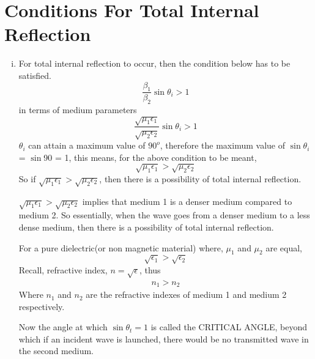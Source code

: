 \section{Conditions For Total Internal Reflection}
\begin{enumerate}[(i)]
\item For total internal reflection to occur, then the condition below has to be satisfied.
\begin{equation*}
\frac{\beta_1}{\beta_2}\sin\theta_i > 1
\end{equation*}
in terms of medium parameters
\begin{equation*}
\frac{\sqrt{\mu_1\epsilon_1}}{\sqrt{\mu_2\epsilon_2}}\sin\theta_i > 1
\end{equation*}
$\theta_i$ can attain a maximum value of $90^{o}$, therefore the maximum value of $\sin\theta_i$ = $\sin$90 = 1, this means, for the above condition to be meant,
\begin{equation}
\sqrt{\mu_1\epsilon_1} > \sqrt{\mu_2\epsilon_2}
\end{equation}
So if $\sqrt{\mu_1\epsilon_1} > \sqrt{\mu_2\epsilon_2}$, then there is a possibility of total internal reflection.

$\sqrt{\mu_1\epsilon_1} > \sqrt{\mu_2\epsilon_2}$ implies that medium 1 is a denser medium compared to medium 2. So essentially, when the wave goes from a denser medium to a less dense medium, then there is a possibility of total internal reflection.

For a pure dielectric(or non magnetic material) where, $\mu_1$ and $\mu_2$ are equal,
\begin{equation*}
\sqrt{\epsilon_1} > \sqrt{\epsilon_2}
\end{equation*}
Recall, refractive index, $n = \sqrt{\epsilon}$, thus
\begin{align*}
n_1 > n_2
\end{align*}
Where $n_1$ and $n_2$ are the refractive indexes of medium 1 and medium 2 respectively.

Now the angle at which $\sin\theta_t = 1$ is called the CRITICAL ANGLE, beyond which if an incident wave is launched, there would be no transmitted wave in the second medium.


\end{enumerate}
